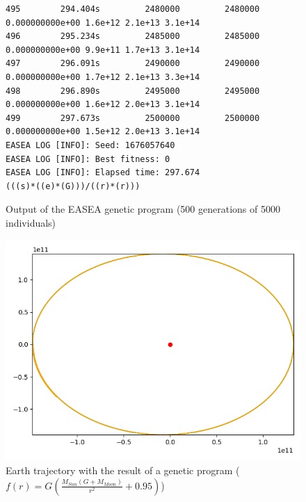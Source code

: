 \begin{figure}
    \begin{lstlisting}
495        294.404s         2480000         2480000 0.000000000e+00 1.6e+12 2.1e+13 3.1e+14
496        295.234s         2485000         2485000 0.000000000e+00 9.9e+11 1.7e+13 3.1e+14
497        296.091s         2490000         2490000 0.000000000e+00 1.7e+12 2.1e+13 3.3e+14
498        296.890s         2495000         2495000 0.000000000e+00 1.6e+12 2.0e+13 3.1e+14
499        297.673s         2500000         2500000 0.000000000e+00 1.5e+12 2.0e+13 3.1e+14
EASEA LOG [INFO]: Seed: 1676057640
EASEA LOG [INFO]: Best fitness: 0
EASEA LOG [INFO]: Elapsed time: 297.674
(((s)*((e)*(G)))/((r)*(r)))
\end{lstlisting}
    \caption{Output of the EASEA genetic program (500 generations of 5000
        individuals)}
    \label{gp_1}
\end{figure}

\begin{figure}
    \center
    \includegraphics[scale=.3]{img/newton_gp_1.png}
    \caption{Earth trajectory with the result of a genetic program (\(f(r) = G \left( \frac{M_{Sun}(G + M_{Moon})}{r^2} + 0.95 \right)\))}
    \label{gp_2}
\end{figure}


